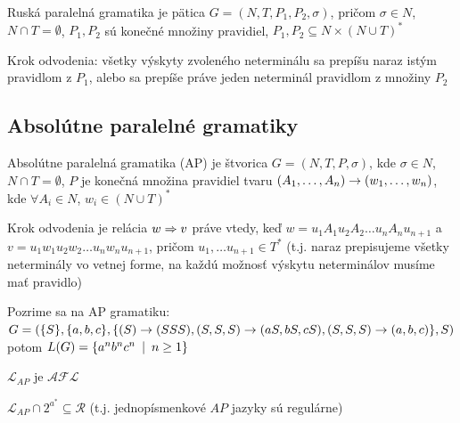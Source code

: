 \begin{definicia}
Ruská paralelná gramatika je pätica $G=(N,T,P_{1},P_{2},\sigma)$,
pričom $\sigma\in N$, \mbox{$N\cap T=\emptyset$}, $P_{1}, P_{2}$
sú konečné množiny pravidiel, $P_{1},P_{2}\subseteq N\times(N\cup
T)^{*}$
\end{definicia}

\begin{definicia}
Krok odvodenia: všetky výskyty zvoleného neterminálu sa prepíšu
naraz istým pravidlom z $P_{1}$, alebo sa prepíše práve jeden
neterminál pravidlom z množiny $P_{2}$
\end{definicia}

\subsection{Absolútne paralelné gramatiky}

\begin{definicia}
Absolútne paralelná gramatika (AP) je štvorica $G=(N,T,P,\sigma)$,
kde \mbox{$\sigma\in N$}, $N\cap T=\emptyset$, $P$ je konečná
množina pravidiel tvaru
$(A_{1},\dots,A_{n})\rightarrow(w_{1},\dots,w_{n})$, kde \mbox{$\forall
A_{i}\in N$}, $w_{i}\in(N\cup T)^{*}$
\end{definicia}

\begin{definicia}
Krok odvodenia je relácia $w\Rightarrow v$ práve vtedy, keď
$w=u_{1}A_{1}u_{2}A_{2}\dots u_{n}A_{n}u_{n+1}$ \mbox{a
$v=u_{1}w_{1}u_{2}w_{2}\dots u_{n}w_{n}u_{n+1}$}, pričom
$u_{1},\dots u_{n+1}\in T^{*}$ (t.j. naraz prepisujeme všetky
neterminály vo vetnej forme, na každú možnosť výskytu neterminálov
musíme mať pravidlo)
\end{definicia}

\begin{priklad}
Pozrime sa na AP gramatiku:\\
$G=(\{S\},\{a,b,c\},\{(S)\rightarrow(SSS),(S,S,S)\rightarrow (aS,bS,cS),(S,S,S)\rightarrow
(a,b,c)\},S)$ potom $L(G)=\{a^{n}b^{n}c^{n}\enspace |\enspace n\geq1\}$
\end{priklad}

\begin{veta}
$\mathcal{L}_{AP}$ je $\mathcal{AFL}$
\end{veta}

\begin{veta}
$\mathcal{L}_{AP}\cap 2^{a^{*}}\subseteq\mathcal{R}$ (t.j.
jednopísmenkové $AP$ jazyky sú regulárne)
\end{veta}

